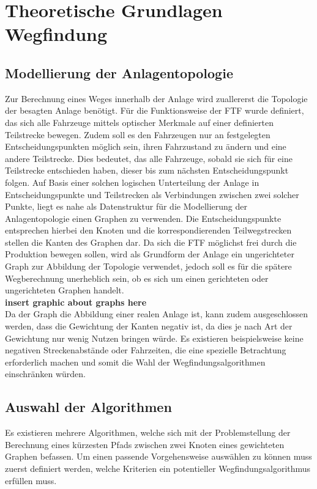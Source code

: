 \chapter{Theoretische Grundlagen Wegfindung}

\section{Modellierung der Anlagentopologie}
	\label{Graph_Anlage}
	Zur Berechnung eines Weges innerhalb der Anlage wird zuallererst die Topologie der besagten Anlage benötigt. Für die Funktionsweise der \ac{FTF} wurde definiert, das sich alle Fahrzeuge mittels optischer Merkmale auf einer definierten Teilstrecke bewegen. Zudem soll es den Fahrzeugen nur an festgelegten Entscheidungspunkten möglich sein, ihren Fahrzustand zu ändern und eine andere Teilstrecke. Dies bedeutet, das alle Fahrzeuge, sobald sie sich für eine Teilstrecke entschieden haben, dieser bis zum nächsten Entscheidungspunkt folgen. Auf Basis einer solchen logischen Unterteilung der Anlage in Entscheidungspunkte und Teilstrecken als Verbindungen zwischen zwei solcher Punkte, liegt es nahe als Datenstruktur für die Modellierung der Anlagentopologie einen Graphen zu verwenden. Die Entscheidungspunkte entsprechen hierbei den Knoten und die korrespondierenden Teilwegstrecken stellen die Kanten des Graphen dar. Da sich die \ac{FTF} möglichst frei durch die Produktion bewegen sollen, wird als Grundform der Anlage ein ungerichteter Graph zur Abbildung der Topologie verwendet, jedoch soll es für die spätere Wegberechnung unerheblich sein, ob es sich um einen gerichteten oder ungerichteten Graphen handelt.\\
	\textbf{insert graphic about graphs here}\\
	Da der Graph die Abbildung einer realen Anlage ist, kann zudem ausgeschlossen werden, dass die Gewichtung der Kanten negativ ist, da dies je nach Art der Gewichtung nur wenig Nutzen bringen würde. Es existieren beispielsweise keine negativen Streckenabstände oder Fahrzeiten, die eine spezielle Betrachtung erforderlich machen und somit die Wahl der Wegfindungsalgorithmen einschränken würden.
	
\section{Auswahl der Algorithmen}

	Es existieren mehrere Algorithmen, welche sich mit der Problemstellung der Berechnung eines kürzesten Pfads zwischen zwei Knoten eines gewichteten Graphen befassen. Um einen passende Vorgehensweise auswählen zu können muss zuerst definiert werden, welche Kriterien ein potentieller Wegfindungsalgorithmus erfüllen muss.
	
